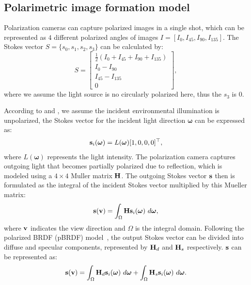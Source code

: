 \subsection{Polarimetric image formation model}
Polarization cameras can capture polarized images in a single shot, 
which can be represented as $4$ different polarized angles of images 
$I=[I_0,I_{45},I_{90},I_{135}]$. 
The Stokes vector $S = \{s_0,s_1,s_2,s_3\}$ can be calculated by:
\begin{equation}
    S = \begin{bmatrix}\frac{1}{2}
        (I_0+I_{45}+I_{90}+I_{135})\\
        I_{0}-I_{90}\\
        I_{45}-I_{135}\\
        0
    \end{bmatrix},
\end{equation}
where we assume the light source is no circularly polarized here,
thus the $s_3$ is 0. 


According to \pandora and \nersp, we assume the incident environmental illumination is unpolarized, 
the Stokes vector 
for the incident light direction $\bm{\omega}$ can be expressed as:
\begin{equation}
    \mathbf{s}_i(\bm{\omega}) = L(\bm{\omega}) [1, 0, 0, 0]^\top,
    \label{eq:env_stok}
\end{equation}
where $L(\bm{\omega})$ represents the light intensity. The polarization 
camera captures outgoing light that becomes partially polarized due to 
reflection, which is modeled using a $4 \times 4$ Muller matrix $\mathbf{H}$. 
The outgoing Stokes vector $\mathbf{s}$ then is formulated as the integral 
of the incident Stokes vector multiplied by this Mueller matrix:
\begin{equation}
    \mathbf{s}(\mathbf{v}) = \int_{\Omega} \mathbf{H} \mathbf{s}_i(\bm{\omega}) \,\, d\bm{\omega},
    \label{eq:out_stok}
\end{equation}
where $\mathbf{v}$ indicates the view direction and $\Omega$ is the integral domain. 
Following the polarized BRDF (pBRDF) model~\cite{baek2018simultaneous}, the 
output Stokes vector can be divided into diffuse and specular components, 
represented by $\mathbf{H}_d$ and $\mathbf{H}_s$ respectively. $\mathbf{s}$ 
can be represented as:
\begin{equation}
    \mathbf{s}(\mathbf{v}) = \int_{\Omega} \mathbf{H}_d \mathbf{s}_i(\bm{\omega}) \,\, d\bm{\omega} + \int_{\Omega} \mathbf{H}_s \mathbf{s}_i(\bm{\omega}) \,\, d\bm{\omega}.
    \label{eq:decomp_stok}
\end{equation}


